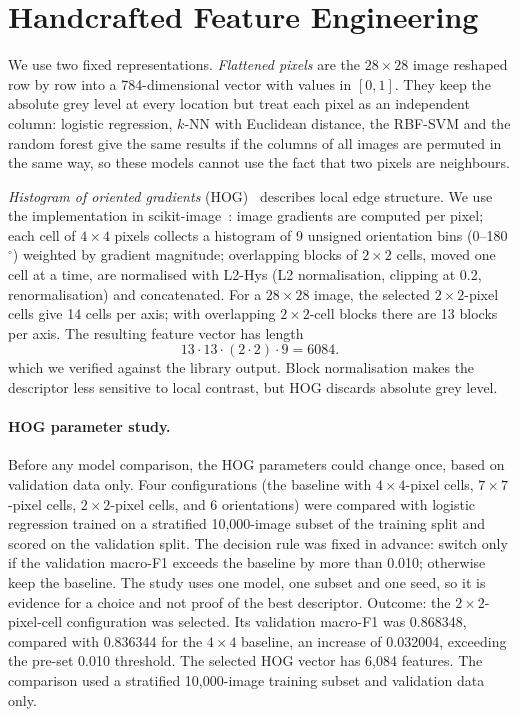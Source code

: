 \section{Handcrafted Feature Engineering}
\label{sec:features}
We use two fixed representations. \emph{Flattened pixels} are the $28\times28$ image reshaped row by row into a
784-dimensional vector with values in $[0,1]$. They keep the absolute grey level at every location but treat each pixel
as an independent column: logistic regression, $k$-NN with Euclidean distance, the RBF-SVM and the random forest give
the same results if the columns of all images are permuted in the same way, so these models cannot use the fact that
two pixels are neighbours.

\emph{Histogram of oriented gradients} (HOG)~\cite{dalal2005histograms} describes local edge structure. We use the
implementation in scikit-image~\cite{vanderwalt2014scikit}: image gradients are computed per pixel; each cell of
$4\times4$ pixels collects a histogram of 9 unsigned orientation bins (0--180$^\circ$) weighted by gradient magnitude;
overlapping blocks of $2\times2$ cells, moved one cell at a time, are normalised with L2-Hys (L2 normalisation,
clipping at 0.2, renormalisation) and concatenated. For a $28\times28$ image, the selected $2\times2$-pixel cells give 14 cells per axis; with overlapping $2\times2$-cell blocks there are 13 blocks per axis. The resulting feature vector has length
\begin{equation}
13\cdot 13\cdot(2\cdot 2)\cdot 9 = 6084.
\end{equation}
which we verified against the library output. Block normalisation makes the descriptor less sensitive to local
contrast, but HOG discards absolute grey level.

\paragraph{HOG parameter study.}
Before any model comparison, the HOG parameters could change once, based on validation data only. Four
configurations (the baseline with $4\times4$-pixel cells, $7\times7$-pixel cells, $2\times2$-pixel cells, and 6 orientations) were compared with
logistic regression trained on a stratified 10{,}000-image subset of the training split and scored on the validation
split. The decision rule was fixed in advance: switch only if the validation macro-F1 exceeds the baseline by more than
0.010; otherwise keep the baseline. The study uses one model, one subset and one seed, so it is evidence for a choice
and not proof of the best descriptor. Outcome: the $2\times2$-pixel-cell configuration was selected. Its validation macro-F1 was 0.868348, compared with 0.836344 for the $4\times4$ baseline, an increase of 0.032004, exceeding the pre-set 0.010 threshold. The selected HOG vector has 6,084 features. The comparison used a stratified 10,000-image training subset and validation data only.

